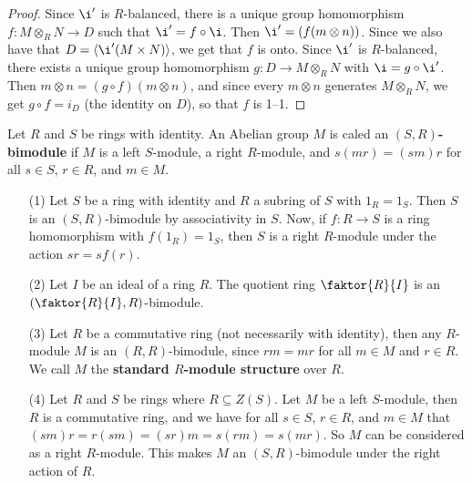 \begin{proof}
    Since $\i'$ is $R$-balanced, there is a unique group homomorphism $f:M
    \otimes_R N \xrightarrow{} D$ such that $\i'=f \circ \i$. Then $\i'=(f(m
    \otimes n))$. Since we also have that $D=\langle \i'(M \times N) \rangle$,
    we get that $f$ is onto. Since $\i'$ is $R$-balanced, there exists a unique
    group homomorphism $g:D \xrightarrow{} M \otimes_R N$ with $\i=g \circ \i'$.
    Then $m \otimes n=(g \circ f)(m \otimes n)$, and since every $m \otimes n$
    generates $M \otimes_R N$, we get $g \circ f=i_D$ (the identity on $D$), so
    that $f$ is 1--1.
\end{proof}

\begin{definition}
    Let $R$ and $S$ be rings with identity. An Abelian group $M$ is caled an
    \textbf{$(S,R)$-bimodule}  if $M$ is a left $S$-module, a right $R$-module,
    and $s(mr)=(sm)r$ for all $s \in S$, $r \in R$, and $m \in M$.
\end{definition}

\begin{example}\label{example_4.10}
    \begin{enumerate}
        \item[(1)] Let $S$ be a ring with identity and $R$ a subring of $S$ with
            $1_R=1_S$. Then $S$ is an $(S,R)$-bimodule by associativity in $S$.
            Now, if $f:R \xrightarrow{} S$ is a ring homomorphism with
            $f(1_R)=1_S$, then $S$ is a right $R$-module under the action
            $sr=sf(r)$.

        \item[(2)] Let $I$ be an ideal of a ring $R$. The quotient ring
            $\faktor{R}{I}$ is an $(\faktor{R}{I},R)$-bimodule.

        \item[(3)] Let $R$ be a commutative ring (not necessarily with
            identity), then any $R$-module $M$ is an $(R,R)$-bimodule, since
            $rm=mr$ for all $m \in M$ and $r \in R$. We call $M$ the
            \textbf{standard $R$-module structure} over $R$.

        \item[(4)] Let $R$ and $S$ be rings where $R \subseteq Z(S)$. Let $M$ be
            a left $S$-module, then $R$ is a commutative ring, and we have for
            all $s \in S$, $r \in R$, and $m \in M$ that
            $(sm)r=r(sm)=(sr)m=s(rm)=s(mr)$. So $M$ can be considered as a right
            $R$-module. This makes $M$ an $(S,R)$-bimodule under the right
            action of $R$.
    \end{enumerate}
\end{example}

